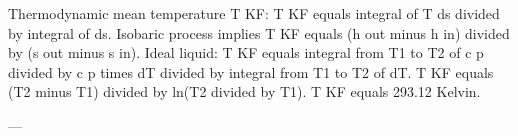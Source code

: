 Thermodynamic mean temperature T KF:  
T KF equals integral of T ds divided by integral of ds.  
Isobaric process implies T KF equals (h out minus h in) divided by (s out minus s in).  
Ideal liquid:  
T KF equals integral from T1 to T2 of c p divided by c p times dT divided by integral from T1 to T2 of dT.  
T KF equals (T2 minus T1) divided by ln(T2 divided by T1).  
T KF equals 293.12 Kelvin.  

---
